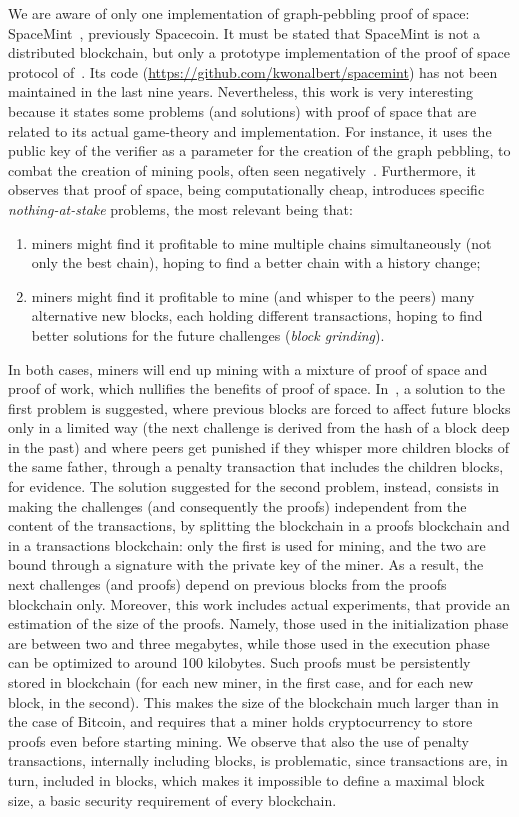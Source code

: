 We are aware of only one implementation of graph-pebbling proof of space:
SpaceMint~\cite{ParkKFGAP18}, previously Spacecoin.
It must be stated that SpaceMint is not a distributed blockchain,
but only a prototype implementation of the proof of space protocol of~\cite{DziembowskiFKP15}.
Its code (\url{https://github.com/kwonalbert/spacemint}) has not been maintained in the last nine years.
Nevertheless, this work is very interesting because it states some problems (and solutions) with proof of space
that are related to its actual game-theory and implementation.
For instance, it uses the public key of the verifier as a parameter for the creation
of the graph pebbling, to combat the creation of mining pools, often seen
negatively~\cite{MillerKKS15}.
Furthermore, it observes that proof of space, being computationally cheap, introduces
specific \emph{nothing-at-stake} problems, the most relevant being that:
%
\begin{enumerate}
\item miners might find it profitable to mine multiple chains simultaneously (not only the best chain),
  hoping to find a better chain with a history change;
\item miners might find it profitable to mine
  (and whisper to the peers) many alternative new blocks, each holding
  different transactions, hoping to find better solutions for the future challenges (\emph{block grinding}).
\end{enumerate}
%
In both cases, miners will end up mining with a mixture of proof of space and proof of work,
which nullifies the benefits of proof of space.
In~\cite{ParkKFGAP18}, a solution to the first problem is suggested, where
previous blocks are forced to affect future blocks only in a limited way
(the next challenge is derived from the hash of a block deep in the past)
and where peers get punished if they
whisper more children blocks of the same father, through a penalty transaction that
includes the children blocks, for evidence.
The solution suggested for the second problem, instead, consists in making the challenges
(and consequently the proofs) independent from the content of the transactions, by splitting the
blockchain in a proofs blockchain and in a transactions blockchain: only the first is used for mining,
and the two are bound through a signature with the private key of the miner.
As a result, the next challenges (and proofs) depend on previous blocks from the proofs blockchain only.
Moreover, this work includes actual experiments, that provide an estimation of the size of the proofs.
Namely, those used in the initialization phase are between two and three megabytes, while those used
in the execution phase can be optimized to around 100 kilobytes. Such proofs must be persistently stored in
blockchain (for each new miner, in the first case, and for each new block, in the second).
This makes the size of the blockchain much larger than in the case of Bitcoin, and requires
that a miner holds cryptocurrency to store proofs even before starting mining.
We observe that also the use of penalty transactions, internally including blocks, is problematic, since
transactions are, in turn, included in blocks, which makes it impossible to define
a maximal block size, a basic security requirement of every blockchain.


